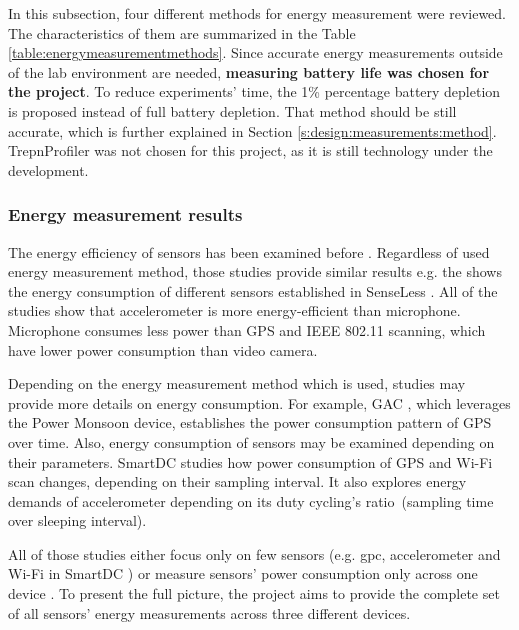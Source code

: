 In this subsection, four different methods for energy measurement were reviewed. The characteristics of them are summarized in the Table \ref{table:energymeasurementmethods}. Since accurate energy measurements outside of the lab environment are needed, \textbf{measuring battery life was chosen for the project}.  To reduce experiments' time, the 1\% percentage battery depletion is proposed instead of full battery depletion. That method should be still accurate, which is further explained in Section \ref{s:design:measurements:method}. TrepnProfiler was not chosen for this project, as it is still technology under the development.

\subsubsection{Energy measurement results}
The energy efficiency of sensors has been examined before \cite{benabdesslem:senseless} \cite{constandache:localization} \cite{wang:eemss} \cite{chon:smartdc}. Regardless of used energy measurement method, those studies provide similar results e.g. the  shows the energy consumption of different sensors established in SenseLess \cite{benabdesslem:senseless}. All of the studies show that accelerometer is more energy-efficient than microphone. Microphone consumes less power than GPS and IEEE 802.11 scanning, which have lower power consumption than video camera.


Depending on the energy measurement method which is used, studies may provide more details on energy consumption. For example, GAC \cite{youssef:gac}, which leverages the Power Monsoon device, establishes the power consumption pattern of GPS over time. Also, energy consumption of sensors may be examined depending on their parameters. SmartDC \cite{chon:smartdc} studies how power consumption of GPS and Wi-Fi scan changes, depending on their sampling interval. It also explores energy demands of accelerometer depending on its duty cycling's ratio\ (sampling time over sleeping interval).

All of those studies either focus only  on few sensors (e.g. gpc, accelerometer and Wi-Fi in SmartDC \cite{chon:smartdc}) or measure sensors' power consumption only across one device \cite{benabdesslem:senseless}. To present the full picture, the project aims to provide the complete set of all sensors' energy measurements across three different devices. 
	
